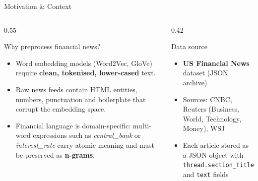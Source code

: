 \documentclass[11pt,aspectratio=169,professionalfonts]{beamer}
\begin{document}
%
\begin{frame}{Motivation \& Context}

  \begin{columns}[T]
    \begin{column}{0.55\textwidth}
      \begin{block}{Why preprocess financial news?}
        \begin{itemize}
          \item Word embedding models (Word2Vec, GloVe) require
                \textbf{clean, tokenised, lower-cased} text.
          \item Raw news feeds contain HTML entities, numbers,
                punctuation and boilerplate that \alert{corrupt
                the embedding space}.
          \item Financial language is domain-specific:
                multi-word expressions such as
                \textit{central\_bank} or \textit{interest\_rate}
                carry atomic meaning and must be preserved
                as \textbf{n-grams}.
        \end{itemize}
      \end{block}
    \end{column}
    \begin{column}{0.42\textwidth}
      \begin{block}{Data source}
        \begin{itemize}
          \item \textbf{US Financial News} dataset
                (JSON archive)
          \item Sources: CNBC, Reuters (Business, World,
                Technology, Money), WSJ
          \item Each article stored as a JSON object
                with \texttt{thread.section\_title}
                and \texttt{text} fields
        \end{itemize}
      \end{block}
    \end{column}
  \end{columns}

\end{frame}
%
%
\end{document}
